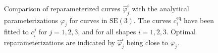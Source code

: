 \begin{figure}
    \caption[Reparameterization of curves in \(\mathrm{SE}(3)\)]{Comparison of reparameterized curves \(\hat{\varphi}_j^i\) with the analytical parameterizations \(\varphi_j\) for curves in \(\mathrm{SE}(3)\). The curves \(c_i^{\text{eq}}\) have been fitted to \(c_i^j\) for \(j = 1, 2, 3\), and for all shapes \(i = 1, 2, 3\). Optimal reparameterizations are indicated by \(\hat{\varphi}_j^i\) being close to \(\varphi_j\).}
    \label{fig:reparameterization-SE3}
\end{figure}


